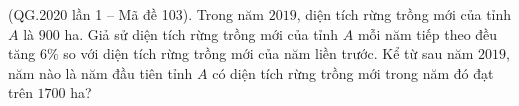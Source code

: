 \begin{ex}%
	(QG.2020 lần 1 -- Mã đề 103).  Trong năm $2019$, diện tích rừng trồng mới của tỉnh $A$ là $900$ ha. Giả sử diện tích rừng trồng mới của tỉnh $A$ mỗi năm tiếp theo đều tăng $6\%$ so với diện tích rừng trồng mới của năm liền trước. Kể từ sau năm $2019$, năm nào là năm đầu tiên tỉnh $A$ có diện tích rừng trồng mới trong năm đó đạt trên $1700$ ha? \\
\end{ex}



